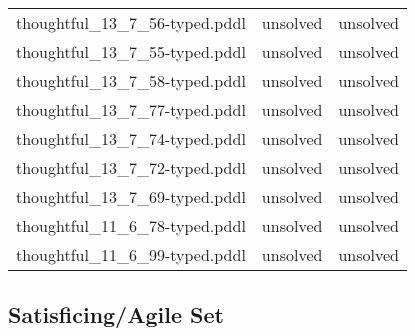 \documentclass{article}
\begin{document}
\begin{center}
\begin{tabular}{r|r|r}
 thoughtful\_13\_7\_56-typed.pddl&unsolved&unsolved\\
 thoughtful\_13\_7\_55-typed.pddl&unsolved&unsolved\\
 thoughtful\_13\_7\_58-typed.pddl&unsolved&unsolved\\
 thoughtful\_13\_7\_77-typed.pddl&unsolved&unsolved\\
 thoughtful\_13\_7\_74-typed.pddl&unsolved&unsolved\\
 thoughtful\_13\_7\_72-typed.pddl&unsolved&unsolved\\
 thoughtful\_13\_7\_69-typed.pddl&unsolved&unsolved\\
 thoughtful\_11\_6\_78-typed.pddl&unsolved&unsolved\\
 thoughtful\_11\_6\_99-typed.pddl&unsolved&unsolved
                            \end{tabular}
                            \end{center}
                    

                    \subsection*{Satisficing/Agile Set}
                    
\end{document}
